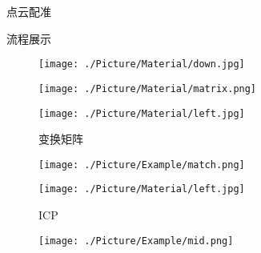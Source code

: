 \documentclass[xcolor=table,compress,blue]{beamer}
\begin{document}
\begin{frame}{点云配准}
\begin{exampleblock}{流程展示}
\begin{figure}[htpb]
\begin{minipage}[b]{0.8in}
				\end{minipage}
				\begin{minipage}[b]{0.6in}
					\centerline{ \texttt{[image: ./Picture/Material/down.jpg]} }
				\end{minipage}
			\end{figure}
			\vspace{-50pt} 
			\hspace{-65pt}
			\vspace{15pt} 
			\begin{figure}[htpb]
				\centering
				\begin{minipage}[b]{0.8in}
					\label{PROBLEM-------cann't show matirx img}
					\centerline{ \texttt{[image: ./Picture/Material/matrix.png]} }
				\end{minipage}
				\begin{minipage}[b]{0.8in}
					\centerline{ \quad}
					\centerline{ \texttt{[image: ./Picture/Material/left.jpg]} }
					\centerline{\tiny{变换矩阵}}
				\end{minipage}
				\begin{minipage}[b]{0.8in}
					\centerline{ \texttt{[image: ./Picture/Example/match.png]} }
				\end{minipage}
				\begin{minipage}[b]{0.8in}
					\centerline{ \texttt{[image: ./Picture/Material/left.jpg]} }
					\centerline{\tiny{ICP}}
				\end{minipage}
				\begin{minipage}[b]{0.8in}
					\centerline{ \texttt{[image: ./Picture/Example/mid.png]} }
				\end{minipage}
			\end{figure}
		\end{exampleblock}
	\end{frame}
\end{document}
